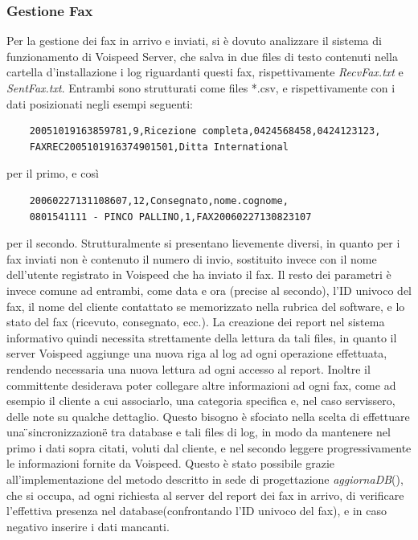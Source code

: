\subsubsection{Gestione Fax}
Per la gestione dei fax in arrivo e inviati, si \`e dovuto analizzare il sistema di funzionamento di Voispeed Server, che salva in due files di testo contenuti nella cartella d'installazione i log riguardanti questi fax, rispettivamente \textit{RecvFax.txt} e \textit{SentFax.txt}. Entrambi sono strutturati come files *.csv, e rispettivamente con i dati posizionati negli esempi seguenti:
\begin{verbatim}
    20051019163859781,9,Ricezione completa,0424568458,0424123123,
    FAXREC2005101916374901501,Ditta International
\end{verbatim} 
per il primo, e cos\`i
\begin{verbatim}
    20060227131108607,12,Consegnato,nome.cognome,
    0801541111 - PINCO PALLINO,1,FAX20060227130823107
\end{verbatim} 
\noindent per il secondo.
Strutturalmente si presentano lievemente diversi, in quanto per i fax inviati non \`e contenuto il numero di invio, sostituito invece con il nome dell'utente registrato in Voispeed che ha inviato il fax. Il resto dei parametri \`e invece comune ad entrambi, come data e ora (precise al secondo), l'ID univoco del fax, il nome del cliente contattato se memorizzato nella rubrica del software, e lo stato del fax (ricevuto, consegnato, ecc.). 
La creazione dei report nel sistema informativo quindi necessita strettamente della lettura da tali files, in quanto il server Voispeed aggiunge una nuova riga al log ad ogni operazione effettuata, rendendo necessaria una nuova lettura ad ogni accesso al report. Inoltre il committente desiderava poter collegare altre informazioni ad ogni fax, come ad esempio il cliente a cui associarlo, una categoria specifica e, nel caso servissero, delle note su qualche dettaglio. Questo bisogno \`e sfociato nella scelta di effettuare una \"{}sincronizzazione\"{} tra database e tali files di log, in modo da mantenere nel primo i dati sopra citati, voluti dal cliente, e nel secondo leggere progressivamente le informazioni fornite da Voispeed. Questo \`e stato possibile grazie all'implementazione del metodo descritto in sede di progettazione \textit{aggiornaDB}(), che si occupa, ad ogni richiesta al server del report dei fax in arrivo, di verificare l'effettiva presenza nel database(confrontando l'ID univoco del fax), e in caso negativo inserire i dati mancanti. 

